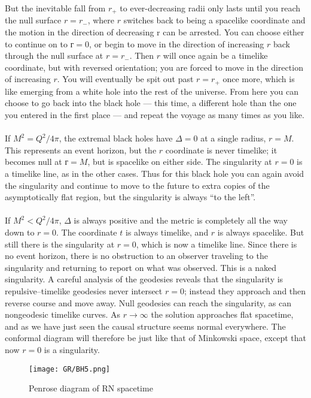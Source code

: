But the inevitable fall from $r_{+}$ to ever-decreasing radii only lasts until you reach the null surface $r = r_{-}$, where $r$ switches back to being a spacelike 
coordinate and the motion in the direction of decreasing r can be arrested. 
You can choose either to continue on to $г = 0$, or begin to move in the direction of increasing $r$ back through the null surface at $r = r_{-}$.
Then $r$ will once again be a timelike coordinate, but with reversed orientation; you are forced to move in the
direction of increasing $r$. 
You will eventually be spit out past $r = r_{+}$ once more, which is like emerging from a white hole into the rest of the universe.
From here you can choose to go back into the black hole --- this time, a different hole than the one you entered in the first place --- and repeat the voyage as many times as you like.
\\ \\
If $M^2 = Q^2 / 4 \pi$, the extremal black holes have $\Delta = 0$ at a single radius, $r = M$. 
This represents an event horizon, but the $r$ coordinate is never timelike; it becomes null at $г = M$, but is spacelike on either side. 
The singularity at $r = 0$ is a timelike line, as in the other cases.
 Thus for this black hole you can again avoid the singularity and continue to move to the future to extra copies of the asymptotically flat region, but the singularity is always ``to the left''. 
\\ \\
If $M^2 < Q^2 / 4 \pi$, $\Delta$ is always positive and the metric is completely all the way down to $r = 0$. 
The coordinate $t$ is always timelike, and $r$ is always spacelike. But still there is the singularity at $r = 0$, which is now a timelike line. 
Since there is no event horizon, there is no obstruction to an observer traveling to the singularity and returning to report on what was observed. 
This is a naked singularity. 
A careful analysis of the geodesies reveals that the singularity is repulsive--timelike geodesies never intersect $r = 0$; instead they approach and then reverse course and move away. 
Null geodesies can reach the singularity, as can nongeodesic timelike curves.
As $r \to \infty$ the solution approaches flat spacetime, and as we have just seen the causal structure seems normal everywhere. 
The conformal diagram will therefore be just like that of Minkowski space, except that now $r = 0$ is a singularity.

\begin{figure}[!htb]
\centering
\texttt{[image: GR/BH5.png]}
\caption{Penrose diagram of RN spacetime}
\end{figure}


